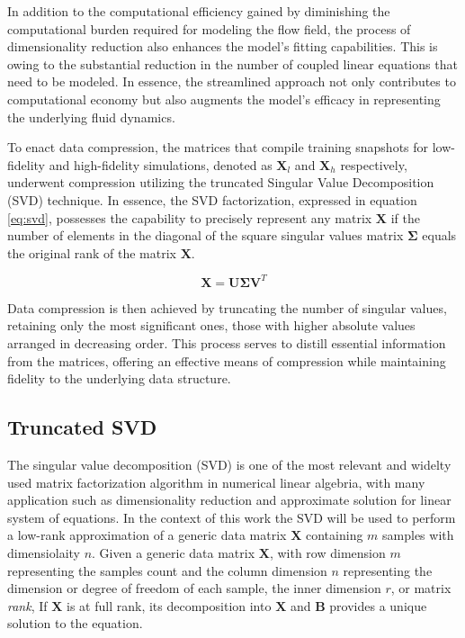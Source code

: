 In addition to the computational efficiency gained by diminishing the computational burden required for modeling the flow field, the process of dimensionality reduction also enhances the model's fitting capabilities. This is owing to the substantial reduction in the number of coupled linear equations that need to be modeled. In essence, the streamlined approach not only contributes to computational economy but also augments the model's efficacy in representing the underlying fluid dynamics.

To enact data compression, the matrices that compile training snapshots for low-fidelity and high-fidelity simulations, denoted as $\mathbf{X}_{l}$ and $\mathbf{X}_h$ respectively, underwent compression utilizing the truncated Singular Value Decomposition (SVD) technique. In essence, the SVD factorization, expressed in equation \ref{eq:svd}, possesses the capability to precisely represent any matrix $\mathbf{X}$ if the number of elements in the diagonal of the square singular values matrix $\mathbf{\Sigma}$ equals the original rank of the matrix $\mathbf{X}$. 

\begin{equation}
    \mathbf{X} = \mathbf{U}\mathbf{\Sigma}\mathbf{V}^T   
\end{equation}

Data compression is then achieved by truncating the number of singular values, retaining only the most significant ones, those with higher absolute values arranged in decreasing order. This process serves to distill essential information from the matrices, offering an effective means of compression while maintaining fidelity to the underlying data structure.

\subsection{Truncated SVD}

The singular value decomposition (SVD) is one of the most relevant and widelty used matrix factorization algorithm in numerical linear algebria, with many application such as dimensionality reduction and approximate solution for linear system of equations. In the context of this work the SVD will be used to perform a low-rank approximation of a generic data matrix $\mathbf{X}$ containing $m$ samples with dimensiolaity $n$. Given a generic data matrix $\mathbf{X}$, with row dimension $m$ representing the samples count and the column dimension $n$ representing the dimension or degree of freedom of each sample, the inner dimension $r$, or  matrix \textit{rank},  If $\mathbf{X}$ is at full rank, its decomposition into $\mathbf{X}$ and $\mathbf{B}$ provides a unique solution to the equation.

